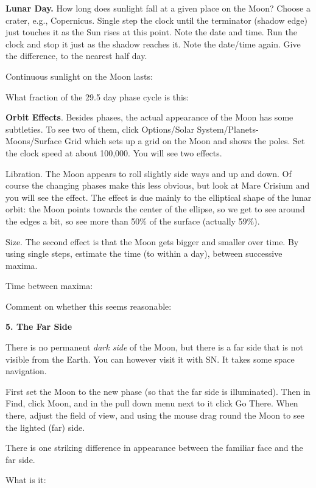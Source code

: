\medskip
\noindent
{\bf Lunar Day.} How long does sunlight fall at a given place on the
Moon? Choose a crater, e.g., Copernicus. Single step the clock until
the terminator (shadow edge) just touches it as the Sun rises at this
point.  Note the date and time. Run the clock and stop it just as the
shadow reaches it. Note the date/time again. Give the difference, to
the nearest half day.

\medskip
Continuous sunlight on the Moon lasts: \makebox[4cm]{\hrulefill}

\medskip
What fraction of the 29.5 day phase cycle is this: \makebox[4cm]{\hrulefill}

\bigskip
\noindent
{\bf Orbit Effects}. Besides phases, the actual appearance of the Moon
has some subtleties. To see two of them, click Options/Solar
System/Planets-Moons/Surface Grid which sets up a grid on the Moon and
shows the poles. Set the clock speed at about 100,000.  You will see
two effects.

\medskip\noindent Libration. The Moon appears to roll slightly side
ways and up and down. Of course the changing phases make this less
obvious, but look at Mare Crisium and you will see the effect. The
effect is due mainly to the elliptical shape of the lunar orbit: the
Moon points towards the center of the ellipse, so we get to see around
the edges a bit, so see more than 50\% of the surface (actually
59\%).

\medskip\noindent Size. The second effect is that the Moon gets
bigger and smaller over time. By using single steps, estimate the time
(to within a day), between successive maxima.

\medskip
Time between maxima: \makebox[4cm]{\hrulefill}

Comment on whether this
seems reasonable: \makebox[4cm]{\hrulefill}


\bigskip
\noindent
{\bf 5. The Far Side} 

\medskip
\noindent
There is no permanent \emph{dark side} of the Moon, but there is a far
side that is not visible from the Earth. You can however visit it with
SN. It takes some space navigation.


First set the Moon to the new phase (so that the far side is
illuminated). Then in Find, click Moon, and in the pull down menu next
to it click Go There. When there, adjust the field of view, and using
the mouse drag round the Moon to see the lighted (far) side.


\medskip\noindent
There is one striking difference in appearance between the familiar
face and the far side.

\medskip
What is it: \makebox[12cm]{\hrulefill}
 

